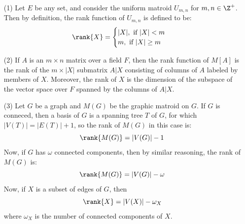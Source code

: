\begin{example}\label{1.12}
    \begin{enumerate}
        \item[(1)] Let $E$ be any set, and consider the uniform matroid
            $U_{m,n}$ for $m,n \in \Z^+$. Then by definition, the rank function
            of  $U_{m,n}$ is defined to be:
            \begin{equation*}
                \rank{X}=\begin{cases}
                            |X|, \text{ if } |X|<m \\
                            m, \text{ if } |X| \geq m \\
                         \end{cases}
            \end{equation*}

        \item[(2)] If $A$ is an  $m \times n$ matrix over a field  $F$, then the
        rank function of  $M[A]$ is the rank of the $m \times |X|$ submatrix
        $A|X$ consisting of columns of $A$ labeled by members of $X$. Moreover,
        the rank of $X$ is the dimension of the subspace of the vector space
        over  $F$ spanned by the columns of  $A|X$.

    \item[(3)] Let $G$ be a graph and $M(G)$ be the graphic matroid on $G$. If
        $G$ is conneced, then a basis of  $G$ is a spanning tree  $T$ of  $G$,
        for which  $|V(T)|=|E(T)|+1$, so the rank of $M(G)$ in this case is:
        \begin{equation*}
            \rank{M(G)}=|V(G)|-1
        \end{equation*}
        Now, if $G$ has  $\omega$ connected components, then by similar
        reasoning, the rank of  $M(G)$ is:
        \begin{equation*}
            \rank{M(G)}=|V(G)|-\omega
        \end{equation*}
        Now, if $X$ is a subset of edges of  $G$, then
        \begin{equation*}
            \rank{X}=|V(X)|-\omega_X
        \end{equation*}
        where  $\omega_X$ is the number of connected components of  $X$.


\end{enumerate}
\end{example}
